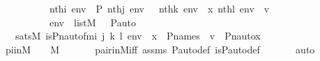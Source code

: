 \begin{isabellebody}
\ \ \ \ \ \ \ \ \ \ {\isachardoublequoteopen}nth{\isacharparenleft}{\kern0pt}i{\isacharcomma}{\kern0pt}\ env{\isacharparenright}{\kern0pt}\ {\isacharequal}{\kern0pt}\ P{\isachardoublequoteclose}\ {\isachardoublequoteopen}nth{\isacharparenleft}{\kern0pt}j{\isacharcomma}{\kern0pt}\ env{\isacharparenright}{\kern0pt}\ {\isacharequal}{\kern0pt}\ {\isasympi}{\isachardoublequoteclose}\ {\isachardoublequoteopen}nth{\isacharparenleft}{\kern0pt}k{\isacharcomma}{\kern0pt}\ env{\isacharparenright}{\kern0pt}\ {\isacharequal}{\kern0pt}\ x{\isachardoublequoteclose}\ {\isachardoublequoteopen}nth{\isacharparenleft}{\kern0pt}l{\isacharcomma}{\kern0pt}\ env{\isacharparenright}{\kern0pt}\ {\isacharequal}{\kern0pt}\ v{\isachardoublequoteclose}\ \isanewline
\ \ \ \ \ \ \ \ \ \ {\isachardoublequoteopen}env\ {\isasymin}\ list{\isacharparenleft}{\kern0pt}M{\isacharparenright}{\kern0pt}{\isachardoublequoteclose}\ {\isachardoublequoteopen}{\isasympi}\ {\isasymin}\ P{\isacharunderscore}{\kern0pt}auto{\isachardoublequoteclose}\ \isanewline
\ \ \ {\isachardoublequoteopen}sats{\isacharparenleft}{\kern0pt}M{\isacharcomma}{\kern0pt}\ is{\isacharunderscore}{\kern0pt}Pn{\isacharunderscore}{\kern0pt}auto{\isacharunderscore}{\kern0pt}fm{\isacharparenleft}{\kern0pt}i{\isacharcomma}{\kern0pt}\ j{\isacharcomma}{\kern0pt}\ k{\isacharcomma}{\kern0pt}\ l{\isacharparenright}{\kern0pt}{\isacharcomma}{\kern0pt}\ env{\isacharparenright}{\kern0pt}\ {\isasymlongleftrightarrow}\ x\ {\isasymin}\ P{\isacharunderscore}{\kern0pt}names\ {\isasymand}\ v\ {\isacharequal}{\kern0pt}\ Pn{\isacharunderscore}{\kern0pt}auto{\isacharparenleft}{\kern0pt}{\isasympi}{\isacharparenright}{\kern0pt}{\isacharbackquote}{\kern0pt}x{\isachardoublequoteclose}\ \isanewline
%
\isadelimproof
%
\endisadelimproof
%
\isatagproof
{}\isamarkupfalse%
\ {\isacharminus}{\kern0pt}\ \isanewline
\isanewline
\ \ \isamarkupfalse%
\ piinM\ {\isacharcolon}{\kern0pt}\ {\isachardoublequoteopen}{\isasympi}\ {\isasymin}\ M{\isachardoublequoteclose}\ \isanewline
\ \ \ \ \isamarkupfalse%
\ pair{\isacharunderscore}{\kern0pt}in{\isacharunderscore}{\kern0pt}M{\isacharunderscore}{\kern0pt}iff\ assms\ P{\isacharunderscore}{\kern0pt}auto{\isacharunderscore}{\kern0pt}def\ is{\isacharunderscore}{\kern0pt}P{\isacharunderscore}{\kern0pt}auto{\isacharunderscore}{\kern0pt}def\ \isanewline
\ \ \ \ \isamarkupfalse%
\ auto\ \ \isanewline
\isanewline
\ \ \isamarkupfalse%

\end{isabellebody}
